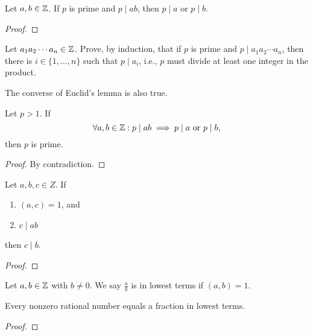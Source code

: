 \documentclass[11pt,a4paper]{article}
\begin{document}
\begin{teo}
    Let \(a,b\in \mathbb{Z}\).
    If \(p\) is prime and \(p\mid ab\), then \(p\mid a\) or \(p\mid b\).
\end{teo}

\begin{proof}
    
\end{proof}

\begin{eje}
    Let \(a_1 a_2 \cdots a_n\in \mathbb{Z}\).
    Prove, by induction, that if \(p\) is prime and \(p\mid a_1 a_2 \cdots a_n\), then there is \(i\in \{1,\ldots,n\}\) such that \(p\mid a_i\), i.e., \(p\) must divide at least one integer in the product.
\end{eje}

The converse of Euclid's lemma is also true.

\begin{prop}
    Let \(p>1\).
    If 
    \[\forall a,b\in \mathbb{Z}  : p\mid ab\implies p\mid a \text{ or } p\mid b,\]
    then \(p\) is prime.
\end{prop}

\begin{proof}
    By contradiction.
\end{proof}


\begin{prop}
    Let \(a,b,c\in Z\).
    If 
    \begin{enumerate}[label=(\roman*)]
        \item \((a,c) = 1\), and
        \item \(c\mid ab\)
    \end{enumerate}
    then \(c\mid b\).
\end{prop}


\begin{proof}
    
\end{proof}



\begin{defi}
    Let \(a,b\in \mathbb{Z}\) with \(b\neq 0\). We say \(\frac{a}{b}    \) is in lowest terms if \((a,b) = 1\).
\end{defi}

\begin{lem}
    Every nonzero rational number equals a fraction in lowest terms.
\end{lem}

\begin{proof}
    
\end{proof}
\end{document}
